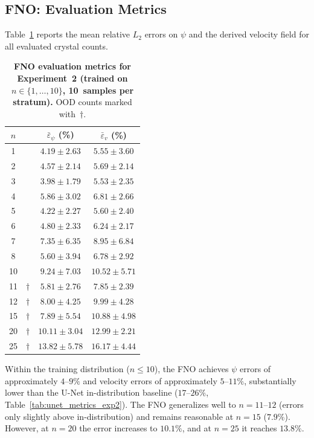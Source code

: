 \subsection{FNO: Evaluation Metrics}
\label{ssec:results:exp2:fno:metrics}

Table~\ref{tab:fno_metrics_exp2} reports the mean relative $L_2$ errors on $\psi$ and the derived velocity field for all evaluated crystal counts.

\begin{table}[htbp]
\centering
\caption{\textbf{FNO evaluation metrics for Experiment~2 (trained on $n \in \{1,\ldots,10\}$,
         10~samples per stratum).} OOD counts marked with~$\dagger$.}
\label{tab:fno_metrics_exp2}
\begin{tabular}{cccc}
\toprule
$n$ & & $\bar{\varepsilon}_\psi$ (\%) & $\bar{\varepsilon}_v$ (\%) \\
\midrule
1  & & $4.19 \pm 2.63$ & $5.55 \pm 3.60$ \\
2  & & $4.57 \pm 2.14$ & $5.69 \pm 2.14$ \\
3  & & $3.98 \pm 1.79$ & $5.53 \pm 2.35$ \\
4  & & $5.86 \pm 3.02$ & $6.81 \pm 2.66$ \\
5  & & $4.22 \pm 2.27$ & $5.60 \pm 2.40$ \\
6  & & $4.80 \pm 2.33$ & $6.24 \pm 2.17$ \\
7  & & $7.35 \pm 6.35$ & $8.95 \pm 6.84$ \\
8  & & $5.60 \pm 3.94$ & $6.78 \pm 2.92$ \\
10 & & $9.24 \pm 7.03$ & $10.52 \pm 5.71$ \\
\midrule
11 & $\dagger$ & $5.81 \pm 2.76$  & $7.85 \pm 2.39$ \\
12 & $\dagger$ & $8.00 \pm 4.25$  & $9.99 \pm 4.28$ \\
15 & $\dagger$ & $7.89 \pm 5.54$  & $10.88 \pm 4.98$ \\
20 & $\dagger$ & $10.11 \pm 3.04$ & $12.99 \pm 2.21$ \\
25 & $\dagger$ & $13.82 \pm 5.78$ & $16.17 \pm 4.44$ \\
\bottomrule
\end{tabular}
\end{table}

Within the training distribution ($n \leq 10$), the FNO achieves $\psi$ errors of approximately $4$–$9\%$ and velocity errors of approximately $5$–$11\%$, substantially lower than the U-Net in-distribution baseline ($17$–$26\%$, Table~\ref{tab:unet_metrics_exp2}). The FNO generalizes well to $n = 11$–$12$ (errors only slightly above in-distribution) and remains reasonable at $n = 15$ ($7.9\%$). However, at $n = 20$ the error increases to $10.1\%$, and at $n = 25$ it reaches $13.8\%$.

